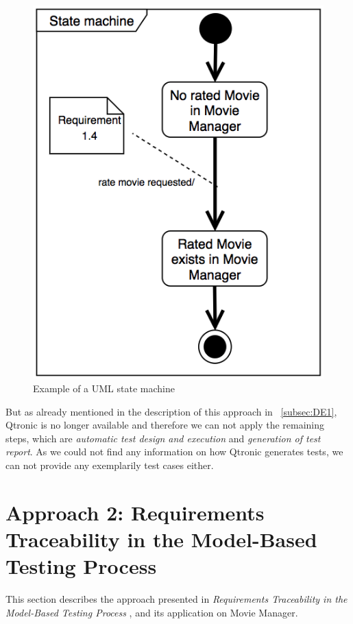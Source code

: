 \begin{figure} [H] 
\centering
\includegraphics[scale=0.35]{../images/Ap1-sm2} 
\caption{Example of a UML state machine}
\label{fig:Ap1-sm2}
\end{figure}

But as already mentioned in the description of this approach in ~\autoref{subsec:DE1}, Qtronic is no longer available and therefore we can not apply the remaining steps, which are \textit{automatic test design and execution} and \textit{generation of test report}. As we could not find any information on how Qtronic generates tests, we can not provide any exemplarily test cases either. 




\section{Approach 2: Requirements Traceability in the Model-Based Testing Process}
\label{sec:AP2}

This section describes the approach presented in \textit{Requirements Traceability in the Model-Based Testing Process} \cite{Paper2}, and its application on Movie Manager. 

